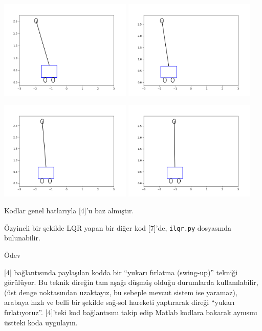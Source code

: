 \documentclass[12pt,fleqn]{article}\usepackage{../../common}
\begin{document}
\includegraphics[width=17em]{frames2/cart-0005.png}
\includegraphics[width=17em]{frames2/cart-0015.png}

\includegraphics[width=17em]{frames2/cart-0020.png}
\includegraphics[width=17em]{frames2/cart-0030.png}

Kodlar genel hatlarıyla [4]'u baz almıştır. 

Özyineli bir şekilde LQR yapan bir diğer kod [7]'de, \verb!ilqr.py! dosyasında
bulunabilir.

Ödev

[4] bağlantısında paylaşılan kodda bir ``yukarı fırlatma (swing-up)''
tekniği görülüyor. Bu teknik direğin tam aşağı düşmüş olduğu durumlarda
kullanılabilir, (üst denge noktasından uzaktayız, bu sebeple mevcut
sistem ise yaramaz), arabaya hızlı ve belli bir şekilde sağ-sol hareketi
yaptırarak direği ``yukarı fırlatıyoruz''. [4]'teki kod bağlantısını takip
edip Matlab kodlara bakarak aynısını üstteki koda uygulayın. 
\end{document}
